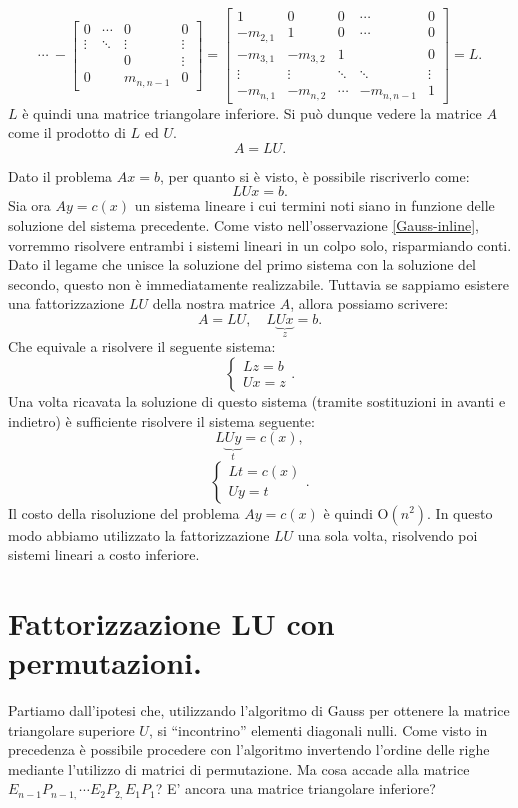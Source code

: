 \[\cdots \ -
\left[\begin{array}{cccc}
0 & \cdots & 0 & 0 \\
\vdots &\ddots & \vdots & \vdots\\
& & 0 & \vdots \\
0 &  & m_{n,n-1} & 0
\end{array}\right]=
\left[\begin{array}{ccccc}
1 & 0 & 0 & \cdots & 0 \\
-m_{2,1} & 1 & 0 & \cdots & 0 \\
-m_{3,1} & -m_{3,2} & 1 & & 0 \\
\vdots & \vdots & \ddots & \ddots & \vdots\\
-m_{n,1} & -m_{n,2} & \cdots & -m_{n,n-1} & 1
\end{array}\right] = L.
\]
$L$ è quindi una matrice triangolare inferiore. Si può dunque vedere la
matrice $A$ come il prodotto di $L$ ed $U$.
\[A = LU.\]

\begin{osse}
Dato il problema $Ax = b$, per quanto si è visto, è possibile riscriverlo
come:
\[LUx = b.\]
Sia ora $Ay = c(x)$ un sistema lineare i cui termini noti siano in funzione
delle soluzione del sistema precedente. Come visto nell'osservazione \ref{Gauss-inline},
vorremmo risolvere entrambi i sistemi lineari in un colpo solo, risparmiando conti. Dato
il legame che unisce la soluzione del primo sistema con la soluzione del secondo, questo
non è immediatamente realizzabile. Tuttavia se sappiamo esistere una fattorizzazione $LU$
della nostra matrice $A$, allora possiamo scrivere:
\[A = LU, \quad L\underbrace{Ux}_{z} = b.\]
Che equivale a risolvere il seguente sistema:
\[
\left\{\begin{array}{l}Lz = b \\ Ux = z\end{array}\right..
\]
Una volta ricavata la soluzione di questo sistema (tramite sostituzioni in
avanti e indietro) è sufficiente risolvere il sistema seguente:
\[L\underbrace{Uy}_{t} = c(x),\]
\[
\left\{\begin{array}{l}Lt = c(x) \\ Uy = t\end{array}\right..
\]
Il costo della risoluzione del problema $Ay = c(x)$ è quindi O$(n^2)$.
In questo modo abbiamo utilizzato la fattorizzazione $LU$ una sola volta,
risolvendo poi sistemi lineari a costo inferiore.
\end{osse}

\section{Fattorizzazione LU con permutazioni.}
Partiamo dall'ipotesi che, utilizzando l'algoritmo di Gauss per ottenere
la matrice triangolare superiore $U$, si ``incontrino'' elementi diagonali
nulli. Come visto in precedenza è possibile procedere con l'algoritmo
invertendo l'ordine delle righe mediante l'utilizzo di matrici di permutazione.
Ma cosa accade alla matrice $E_{n-1}P_{n-1,} \cdots E_{2}P_{2,}E_{1}P_{1}$? E'
ancora una matrice triangolare inferiore?

